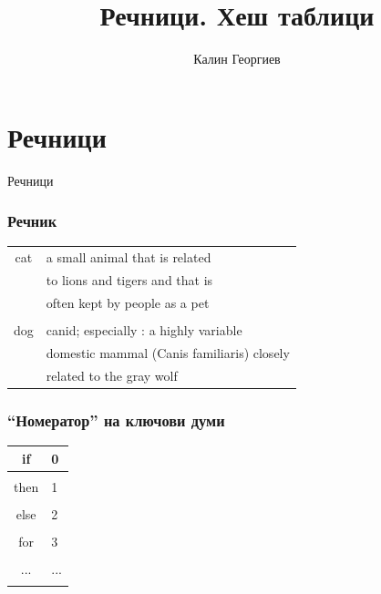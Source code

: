 \documentclass{beamer}
\begin{document}
\title[Структури от данни и програмиране]{Речници. Хеш таблици} 
\author{Калин Георгиев} 
\frame{\titlepage} 

\section{Речници} 


\begin{frame}
\centerline{Речници}
\end{frame}


\begin{frame}[fragile]
\frametitle{Речник}
\begin{center}
\begin{tabular} {c | l}
  cat & a small animal that is related \\
      & to lions and tigers and that is \\
      & often kept by people as a pet \\
      \hline\\
  dog & canid; especially :  a highly variable \\
      & domestic mammal (Canis familiaris) closely \\
      & related to the gray wolf
\end{tabular}  
\end{center}
\end{frame}

\begin{frame}[fragile]
\frametitle{``Номератор'' на ключови думи}
\begin{center}
\begin{tabular} {c | l}
  if & 0 \\
      \hline\\
  then & 1 \\
      \hline\\
  else & 2 \\
      \hline\\
  for & 3 \\
      \hline\\
  ... & ... \\
      \hline\\
\end{tabular}  
\end{center}
\end{frame}
\end{document}
